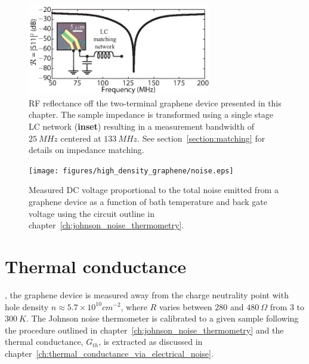 \begin{figure}
\centering
\includegraphics[width=80mm]{figures/high_density_graphene/matching.eps}
\caption{RF reflectance off the two-terminal graphene device presented in this chapter. The sample impedance is transformed using a single stage LC network (\textbf{inset}) resulting in a measurement bandwidth of $25~MHz$ centered at $133~MHz$. See section~\ref{section:matching} for details on impedance matching.}
\label{fig:Aria_matching}
\end{figure}

\begin{figure}
\centering
\texttt{[image: figures/high\_density\_graphene/noise.eps]}
\caption{Measured DC voltage proportional to the total noise emitted from a graphene device as a function of bath temperature and back gate voltage using the circuit outline in chapter~\ref{ch:johnson_noise_thermometry}.}
\label{fig:Aria_noise}
\end{figure}

\section{Thermal conductance}
, the graphene device is measured away from the charge neutrality point with hole density $n\approx5.7\times 10^{10}cm^{-2}$, where $R$ varies between $280$ and $480~\Omega$ from $3$ to $300~K$. The Johnson noise thermometer is calibrated to a given sample following the procedure outlined in chapter~\ref{ch:johnson_noise_thermometry} and the thermal conductance, $G_{th}$, is extracted as discussed in chapter~\ref{ch:thermal_conductance_via_electrical_noise}.

